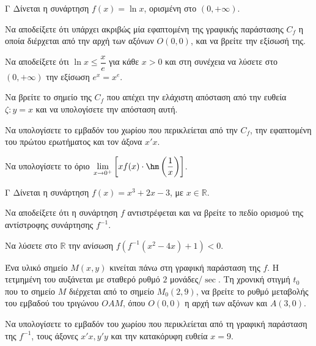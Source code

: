 \begin{thema}{Γ}
Δίνεται η συνάρτηση $f(x) = \ln x$, ορισμένη στο $(0, +\infty)$.
\begin{erwthma}
  \item Να αποδείξετε ότι υπάρχει ακριβώς μία εφαπτομένη της γραφικής παράστασης $C_f$ η οποία διέρχεται από την αρχή των αξόνων $O(0, 0)$, και να βρείτε την εξίσωσή της.
  \item Να αποδείξετε ότι $\ln x \le \dfrac{x}{e}$ για κάθε $x > 0$ και στη συνέχεια να λύσετε στο $(0, +\infty)$ την εξίσωση $e^x = x^e$.
  \item Να βρείτε το σημείο της $C_f$ που απέχει την ελάχιστη απόσταση από την ευθεία $\zeta: y = x$ και να υπολογίσετε την απόσταση αυτή.
  \item Να υπολογίσετε το εμβαδόν του χωρίου που περικλείεται από την $C_f$, την εφαπτομένη του πρώτου ερωτήματος και τον άξονα $x'x$.
  \item Να υπολογίσετε το όριο $\lim\limits_{x \to 0^+} \left[ x f(x) \cdot \hm\left(\dfrac{1}{x}\right) \right]$.
\end{erwthma}
\end{thema}

\begin{thema}{Γ}
Δίνεται η συνάρτηση $f(x) = x^3 + 2x - 3$, με $x \in \mathbb{R}$.
\begin{erwthma}
  \item Να αποδείξετε ότι η συνάρτηση $f$ αντιστρέφεται και να βρείτε το πεδίο ορισμού της αντίστροφης συνάρτησης $f^{-1}$.
  \item Να λύσετε στο $\mathbb{R}$ την ανίσωση $f\left(f^{-1}(x^2 - 4x) + 1\right) < 0$.
  \item Ένα υλικό σημείο $M(x, y)$ κινείται πάνω στη γραφική παράσταση της $f$. Η τετμημένη του αυξάνεται με σταθερό ρυθμό $2$ μονάδες/$\sec$. Τη χρονική στιγμή $t_0$ που το σημείο $M$ διέρχεται από το σημείο $M_0(2, 9)$, να βρείτε το ρυθμό μεταβολής του εμβαδού του τριγώνου $OAM$, όπου $O(0,0)$ η αρχή των αξόνων και $A(3, 0)$.
  \item Να υπολογίσετε το εμβαδόν του χωρίου που περικλείεται από τη γραφική παράσταση της $f^{-1}$, τους άξονες $x'x, y'y$ και την κατακόρυφη ευθεία $x = 9$.
\end{erwthma}
\end{thema}

